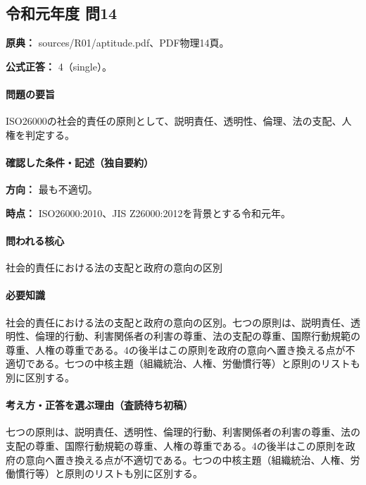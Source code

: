 \subsection{令和元年度 問14}
\label{q:r01-reg-apt-14}

\noindent\textbf{原典：} sources/R01/aptitude.pdf、PDF物理14頁。

\textbf{公式正答：} 4（single）。

\paragraph{問題の要旨} ISO26000の社会的責任の原則として、説明責任、透明性、倫理、法の支配、人権を判定する。

\paragraph{確認した条件・記述（独自要約）}\mbox{}\par

\noindent\textbf{方向：} 最も不適切。\par

\noindent\textbf{時点：} ISO26000:2010、JIS Z26000:2012を背景とする令和元年。\par

\paragraph{問われる核心} 社会的責任における法の支配と政府の意向の区別

\paragraph{必要知識} 社会的責任における法の支配と政府の意向の区別。七つの原則は、説明責任、透明性、倫理的行動、利害関係者の利害の尊重、法の支配の尊重、国際行動規範の尊重、人権の尊重である。4の後半はこの原則を政府の意向へ置き換える点が不適切である。七つの中核主題（組織統治、人権、労働慣行等）と原則のリストも別に区別する。

\paragraph{考え方・正答を選ぶ理由（査読待ち初稿）} 七つの原則は、説明責任、透明性、倫理的行動、利害関係者の利害の尊重、法の支配の尊重、国際行動規範の尊重、人権の尊重である。4の後半はこの原則を政府の意向へ置き換える点が不適切である。七つの中核主題（組織統治、人権、労働慣行等）と原則のリストも別に区別する。

